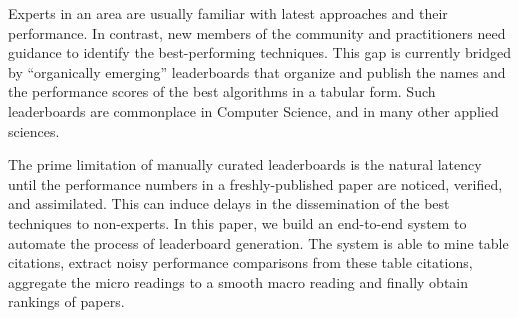 \documentclass[runningheads]{llncs}
\begin{document}
Experts in an area are usually familiar with latest approaches and their performance.  In contrast, new members of the community and practitioners need guidance to identify the best-performing techniques.  This gap is currently bridged by ``organically emerging'' leaderboards that organize and publish the names and the performance scores of the best algorithms in a tabular form.  Such leaderboards are commonplace in Computer Science, and in many other applied sciences.

The prime limitation of manually curated leaderboards is the natural latency until the performance numbers in a freshly-published paper are noticed, verified, and assimilated.  This can induce delays in the dissemination of the best techniques to non-experts.  In this paper, we build an end-to-end system to automate the process of leaderboard generation.  The system is able to mine table citations, extract noisy performance comparisons from these table citations, aggregate the micro readings to a smooth macro reading and finally obtain rankings of papers.  
\end{document}
